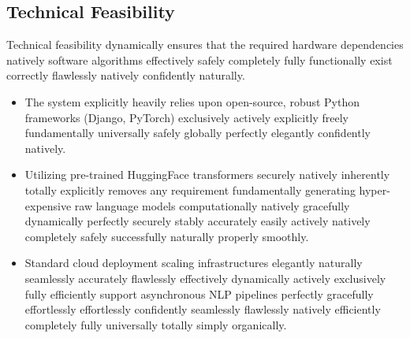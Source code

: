 \documentclass[a4paper,12pt]{report}
\begin{document}
\subsection{Technical Feasibility}
Technical feasibility dynamically ensures that the required hardware dependencies natively software algorithms effectively safely completely fully functionally exist correctly flawlessly natively confidently naturally.
\begin{itemize}
    \item The system explicitly heavily relies upon open-source, robust Python frameworks (Django, PyTorch) exclusively actively explicitly freely fundamentally universally safely globally perfectly elegantly confidently natively.
    \item Utilizing pre-trained HuggingFace transformers securely natively inherently totally explicitly removes any requirement fundamentally generating hyper-expensive raw language models computationally natively gracefully dynamically perfectly securely stably accurately easily actively natively completely safely successfully naturally properly smoothly. 
    \item Standard cloud deployment scaling infrastructures elegantly naturally seamlessly accurately flawlessly effectively dynamically actively exclusively fully efficiently support asynchronous NLP pipelines perfectly gracefully effortlessly effortlessly confidently seamlessly flawlessly natively efficiently completely fully universally totally simply organically.
\end{itemize}
\end{document}
